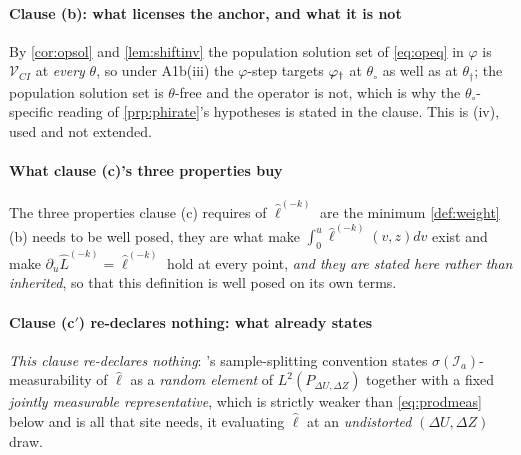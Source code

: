 \paragraph{Clause \textup{(b)}: what licenses the anchor, and what it is not}

By \cref{cor:opsol} and \cref{lem:shiftinv} the population solution set of \eqref{eq:opeq} in $\varphi$
is $\mathcal V_{CI}$ at \emph{every} $\theta$, so under A1b(iii) the $\varphi$-step targets $\varphi_{\dagger}$
at $\theta_\circ$ as well as at $\theta_\dagger$; the population solution set is $\theta$-free and the
operator is not, which is why the $\theta_\circ$-specific reading of \cref{prp:phirate}'s hypotheses is
stated in the clause. This is \textup{(iv)}, used and not extended.

\paragraph{What clause \textup{(c)}'s three properties buy}

The three properties clause \textup{(c)} requires of $\hat\ell^{(-k)}$ are the minimum
\cref{def:weight}(b) needs to be well posed, they are what make $\int_0^u\hat\ell^{(-k)}(v,z)dv$ exist
and make $\partial_u\hat L^{(-k)}=\hat\ell^{(-k)}$ hold at every point, \emph{and they are stated here
rather than inherited}, so that this definition is well posed on its own terms.

\paragraph{Clause \textup{(c$'$)} re-declares nothing: what  already states}

\emph{This clause re-declares nothing}:
's sample-splitting convention states
$\sigma(\mathcal I_a)$-measurability of $\hat\ell$ as a \emph{random element} of
$L^{2}(P_{\Delta U,\Delta Z})$ together with a fixed \emph{jointly measurable representative}, which is
strictly weaker than \eqref{eq:prodmeas} below and is all that site needs, it evaluating $\hat\ell$ at an
\emph{undistorted} $(\Delta U,\Delta Z)$ draw.

